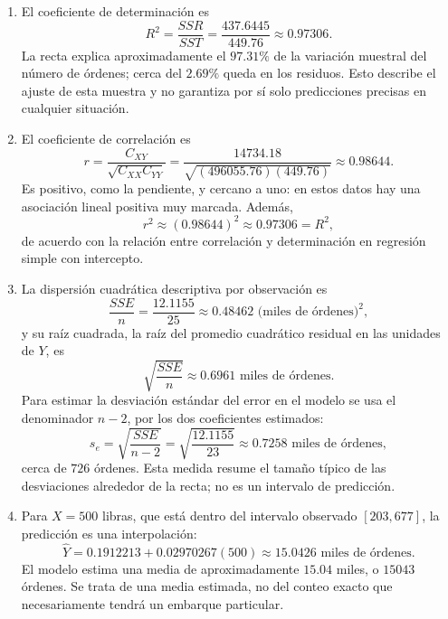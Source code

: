 \begin{enumerate}
    \item[\textbf{i)}] El coeficiente de determinación es
    \[
    R^2=\frac{SSR}{SST}=\frac{437.6445}{449.76}\approx0.97306.
    \]
    La recta explica aproximadamente el $97.31\%$ de la variación muestral del número de órdenes; cerca del $2.69\%$ queda en los residuos. Esto describe el ajuste de esta muestra y no garantiza por sí solo predicciones precisas en cualquier situación.

    \item[\textbf{j)}] El coeficiente de correlación es
    \[
    r=\frac{C_{XY}}{\sqrt{C_{XX}C_{YY}}}
    =\frac{14734.18}{\sqrt{(496055.76)(449.76)}}\approx0.98644.
    \]
    Es positivo, como la pendiente, y cercano a uno: en estos datos hay una asociación lineal positiva muy marcada. Además,
    \[
    r^2\approx(0.98644)^2\approx0.97306=R^2,
    \]
    de acuerdo con la relación entre correlación y determinación en regresión simple con intercepto.

    \item[\textbf{k)}] La dispersión cuadrática descriptiva por observación es
    \[
    \frac{SSE}{n}=\frac{12.1155}{25}\approx0.48462\text{ (miles de órdenes)}^2,
    \]
    y su raíz cuadrada, la raíz del promedio cuadrático residual en las unidades de $Y$, es
    \[
    \sqrt{\frac{SSE}{n}}\approx0.6961\text{ miles de órdenes}.
    \]
    Para estimar la desviación estándar del error en el modelo se usa el denominador $n-2$, por los dos coeficientes estimados:
    \[
    s_e=\sqrt{\frac{SSE}{n-2}}=\sqrt{\frac{12.1155}{23}}\approx0.7258\text{ miles de órdenes},
    \]
    cerca de $726$ órdenes. Esta medida resume el tamaño típico de las desviaciones alrededor de la recta; no es un intervalo de predicción.

    \item[\textbf{l)}] Para $X=500$ libras, que está dentro del intervalo observado $[203,677]$, la predicción es una interpolación:
    \[
    \widehat Y=0.1912213+0.02970267(500)\approx15.0426\text{ miles de órdenes}.
    \]
    El modelo estima una media de aproximadamente $15.04$ miles, o $15043$ órdenes. Se trata de una media estimada, no del conteo exacto que necesariamente tendrá un embarque particular.


\end{enumerate}
